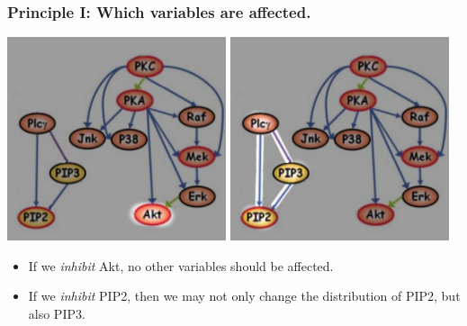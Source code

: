 \documentclass{beamer}
\begin{document}
\begin{frame}
\frametitle{Principle I: Which variables are affected.}

\begin{center}
\includegraphics[scale = 0.5]{../images/fig01_03.png}
\hspace{0.5in}
\includegraphics[scale = 0.5]{../images/fig01_02.png}
\end{center}

\begin{itemize}
\item If we \emph{inhibit} Akt, no other variables should be affected.
\item If we \emph{inhibit} PIP2, then we may not only change the distribution of PIP2, but also PIP3.
\end{itemize}

\end{frame}
\end{document}
